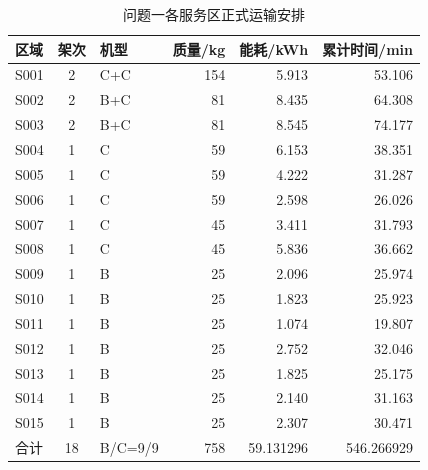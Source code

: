 \begin{table}[htbp]\centering\small
\caption{问题一各服务区正式运输安排}\label{tab:q1_area_plan}
\begin{tabular}{@{}lclrrr@{}}
\toprule
区域 & 架次 & 机型 & 质量/kg & 能耗/kWh & 累计时间/min\\
\midrule
S001 & 2 & C+C & 154 & 5.913 & 53.106\\
S002 & 2 & B+C & 81 & 8.435 & 64.308\\
S003 & 2 & B+C & 81 & 8.545 & 74.177\\
S004 & 1 & C & 59 & 6.153 & 38.351\\
S005 & 1 & C & 59 & 4.222 & 31.287\\
S006 & 1 & C & 59 & 2.598 & 26.026\\
S007 & 1 & C & 45 & 3.411 & 31.793\\
S008 & 1 & C & 45 & 5.836 & 36.662\\
S009 & 1 & B & 25 & 2.096 & 25.974\\
S010 & 1 & B & 25 & 1.823 & 25.923\\
S011 & 1 & B & 25 & 1.074 & 19.807\\
S012 & 1 & B & 25 & 2.752 & 32.046\\
S013 & 1 & B & 25 & 1.825 & 25.175\\
S014 & 1 & B & 25 & 2.140 & 31.163\\
S015 & 1 & B & 25 & 2.307 & 30.471\\
合计 & 18 & B/C=9/9 & 758 & 59.131296 & 546.266929\\
\bottomrule
\end{tabular}
\end{table}
